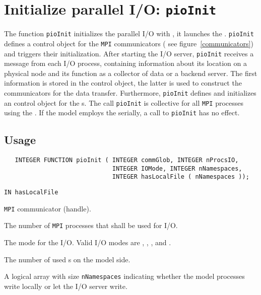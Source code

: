 \section{Initialize parallel I/O: {\tt pioInit}}
\label{pioInit}
The function {\tt pioInit} initializes the parallel I/O with {\CDI}, it launches 
the {}. {\tt pioInit} defines 
a control object for the {\tt MPI} communicators ( see 
figure~\ref{communicators}) and triggers their 
initialization. After starting the I/O server, {\tt pioInit} receives a message 
from each I/O process, containing information about its location on a physical node 
and its function as a collector of data or a backend server. The first information 
is stored in the control object, the latter is used to construct the communicators 
for the data transfer. Furthermore, {\tt pioInit} defines and initializes an 
control object for the {}s. The call {\tt pioInit} is 
collective for all 
{\tt MPI} processes using the {\CDI}. If the 
model employs the {\CDI} serially, a  
call to {\tt pioInit} has no effect. 

\subsection*{Usage}
\begin{verbatim}
   INTEGER FUNCTION pioInit ( INTEGER commGlob, INTEGER nProcsIO, 
                              INTEGER IOMode, INTEGER nNamespaces, 
                              INTEGER hasLocalFile ( nNamespaces ));
\end{verbatim}

\hspace*{4mm}\begin{minipage}[]{15cm}
\begin{deflist}{\tt IN  hasLocalFile\ }
\item[{\tt IN  commGlob}]
{\tt MPI} communicator (handle).
\item[{\tt IN  nProcsIO}]
The number of {\tt MPI} processes that shall be used for I/O.
\item[{\tt IN  IOMode}]
The mode for the I/O. Valid I/O modes are {}, 
{}, {}, 
{} and 
{}.
\item[{\tt IN  nNamespaces}]
The number of used {}s on the model side.
\item[{\tt IN  hasLocalFile}]
A logical array with size {\tt nNamespaces} indicating whether the model 
processes write locally or let the I/O server write.
\end{deflist}
\end{minipage}

